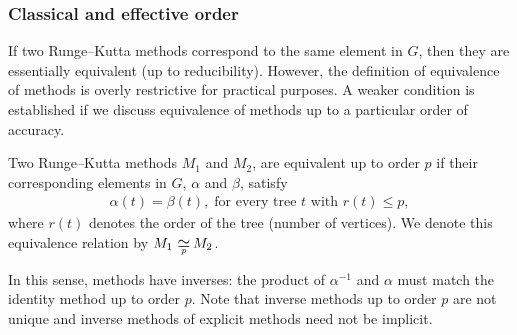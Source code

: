 \subsubsection{Classical and effective order}\label{subsubsec:Classical_effective_order}
If two Runge--Kutta methods correspond to the same element in $G$, 
then they are essentially equivalent (up to reducibility).
However, the definition of equivalence of methods is overly restrictive 
for practical purposes. A weaker condition is established if we 
discuss equivalence of methods up to a particular order of accuracy.
\begin{definition}\label{def:Equivalent_methods}
	Two Runge--Kutta methods $M_1$ and $M_2$, are equivalent up to order 
	$p$ if their corresponding elements in $G$, $\alpha$ and $\beta$, satisfy
	\begin{align*}
		\alpha(t) = \beta(t), \; \text{for every tree $t$ with $r(t) \leq p$},
	\end{align*}
	where $r(t)$ denotes the order of the tree (number of vertices).
	We denote this equivalence relation by $M_1 \equival{p} M_2$. 
\end{definition}

In this sense, methods have inverses: the product of $\alpha^{-1}$ and
$\alpha$ must match the identity method up to order $p$.
Note that inverse methods up to order $p$ are not unique and inverse 
methods of explicit methods need not be implicit.

